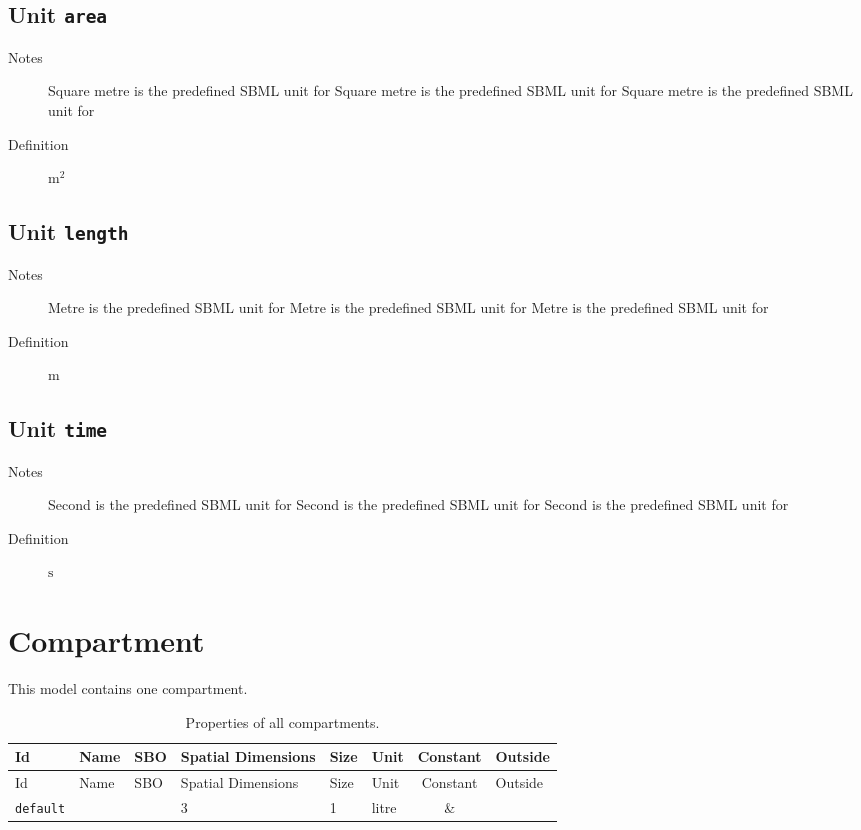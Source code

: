 \documentclass[11pt,twoside,a4paper]{scrartcl}
\newcommand{\yes}{\parbox[c]{1.3em}{\Large\Square\hspace{-.65em}\ding{51}}}
\begin{document}
\subsection{Unit \texttt{area}}
\begin{description}
\item[Notes] Square metre is the predefined SBML unit for Square metre is the predefined SBML unit for Square metre is the predefined SBML unit for 
\item[Definition] $\mathrm{m}^{2}$
\end{description}

\subsection{Unit \texttt{length}}
\begin{description}
\item[Notes] Metre is the predefined SBML unit for Metre is the predefined SBML unit for Metre is the predefined SBML unit for 
\item[Definition] $\mathrm{m}$
\end{description}

\subsection{Unit \texttt{time}}
\begin{description}
\item[Notes] Second is the predefined SBML unit for Second is the predefined SBML unit for Second is the predefined SBML unit for 
\item[Definition] $\mathrm{s}$
\end{description}

\section{Compartment}
This model contains one compartment.
\begin{longtable}[h!]{@{}lllC{2cm}llcl@{}}
\caption{Properties of all compartments.}\\
\toprule
Id&Name&SBO&Spatial Dimensions&Size&Unit&Constant&Outside\\
\midrule
\endfirsthead
\toprule
Id&Name&SBO&Spatial Dimensions&Size&Unit&Constant&Outside\\
\midrule
\endhead
\texttt{default}&&&3&1&litre&\yes&\texttt{}\\
\bottomrule\end{longtable}
\end{document}
